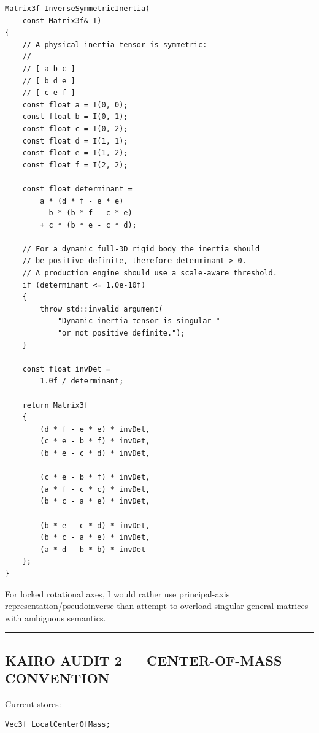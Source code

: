 \begin{verbatim}
Matrix3f InverseSymmetricInertia(
    const Matrix3f& I)
{
    // A physical inertia tensor is symmetric:
    //
    // [ a b c ]
    // [ b d e ]
    // [ c e f ]
    const float a = I(0, 0);
    const float b = I(0, 1);
    const float c = I(0, 2);
    const float d = I(1, 1);
    const float e = I(1, 2);
    const float f = I(2, 2);

    const float determinant =
        a * (d * f - e * e)
        - b * (b * f - c * e)
        + c * (b * e - c * d);

    // For a dynamic full-3D rigid body the inertia should
    // be positive definite, therefore determinant > 0.
    // A production engine should use a scale-aware threshold.
    if (determinant <= 1.0e-10f)
    {
        throw std::invalid_argument(
            "Dynamic inertia tensor is singular "
            "or not positive definite.");
    }

    const float invDet =
        1.0f / determinant;

    return Matrix3f
    {
        (d * f - e * e) * invDet,
        (c * e - b * f) * invDet,
        (b * e - c * d) * invDet,

        (c * e - b * f) * invDet,
        (a * f - c * c) * invDet,
        (b * c - a * e) * invDet,

        (b * e - c * d) * invDet,
        (b * c - a * e) * invDet,
        (a * d - b * b) * invDet
    };
}
\end{verbatim}

For locked rotational axes, I would rather use principal-axis representation/pseudoinverse than attempt to overload singular general matrices with ambiguous semantics.

\begin{center}\rule{0.5\linewidth}{0.5pt}\end{center}

\subsection{KAIRO AUDIT 2 --- CENTER-OF-MASS CONVENTION}\label{06-engine-ii-ch035-kairo-audit-2-center-of-mass-convention}

\hypertarget{06-engine-ii-ch035-kairo-audit-2-center-of-mass-convention}{}

Current  stores:

\begin{verbatim}
Vec3f LocalCenterOfMass;
\end{verbatim}

